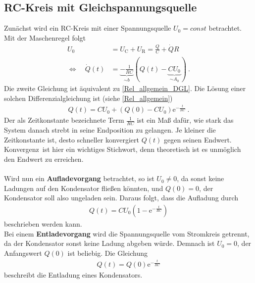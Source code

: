 \subsection{RC-Kreis mit Gleichspannungsquelle \label{sec:Gleichspannung}}
Zunächst wird ein RC-Kreis mit einer Spannungsquelle $U_0 = const$ betrachtet. Mit der Maschenregel folgt
\begin{align}
	U_0 &= U_\text{C} + U_\text{R} = \frac{Q}{C} + \dot{Q}R \\
	\Leftrightarrow\quad \dot{Q}(t) &= \underbrace{-\frac{1}{RC}}_{\sim b}(Q(t) - \underbrace{CU_0}_{\sim A_0}) \ .
\end{align}
Die zweite Gleichung ist äquivalent zu \eqref{Rel_allgemein_DGL}. Die Lösung einer solchen Differenzialgleichung ist (siehe \eqref{Rel_allgemein})
\begin{align}
	Q(t) = CU_0 + \left( Q(0) - CU_0 \right)\mathrm{e}^{-\frac{t}{RC}} \ .
\end{align}
Der als Zeitkonstante bezeichnete Term $\frac{1}{RC}$ ist ein Maß dafür, wie stark das System danach strebt in seine Endposition zu gelangen. Je kleiner die Zeitkonstante ist, desto schneller konvergiert $Q(t)$ gegen seinen Endwert. \glqq Konvergenz\grqq\ ist hier ein wichtiges Stichwort, denn theoretisch ist es unmöglich den Endwert zu erreichen. \\
\ \\
Wird nun ein \textbf{Aufladevorgang} betrachtet, so ist $U_0 \not= 0$, da sonst keine Ladungen auf den Kondensator fließen könnten, und $Q(0) = 0$, der Kondensator soll also ungeladen sein. Daraus folgt, dass die Aufladung durch
\begin{align}\label{Aufladung}
	Q(t) = CU_0 \left( 1 - \mathrm{e}^{-\frac{t}{RC}} \right)
\end{align}
beschrieben werden kann. \\
Bei einem \textbf{Entladevorgang} wird die Spannungsquelle vom Stromkreis getrennt, da der Kondensator sonst keine Ladung abgeben würde. Demnach ist $U_0 = 0$, der Anfangswert $Q(0)$ ist beliebig. Die Gleichung
\begin{align}
	Q(t) = Q(0)\mathrm{e}^{-\frac{t}{RC}}
\end{align}
beschreibt die Entladung eines Kondensators.


